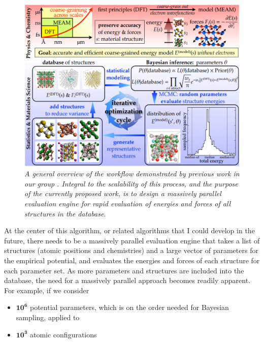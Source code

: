 \documentclass[11pt]{article}
\begin{document}
\begin{figure}
  \begin{minipage}[t]{0.65\linewidth}
    \vskip0pt
    \includegraphics[width=\textwidth]{workflow.png}
  \end{minipage}
  \hfill
  \begin{minipage}[t]{0.3\linewidth}
    \caption{\label{fig:workflow}
      \textit{A general overview of the workflow demonstrated by previous work in our group \cite{dbopt}. Integral to the scalability of this process, and the purpose of the currently proposed work, is to design a massively parallel evaluation engine for rapid evaluation of energies and forces of all structures in the database.}}
  \end{minipage}
\end{figure}

At the center of this algorithm, or related algorithms that I could develop in the future, there needs to be a massively parallel evaluation engine that takes a list of structures (atomic positions and chemistries) and a large vector of parameters for the empirical potential, and evaluates the energies and forces of each structure for each parameter set. As more parameters and structures are included into the database, the need for a massively parallel approach becomes readily apparent. For example, if we consider

\begin{itemize}
    \item $\mathbf{10^6}$ potential parameters, which is on the order needed for Bayesian sampling, applied to
    \item $\mathbf{10^3}$ atomic configurations
\end{itemize}
\end{document}
